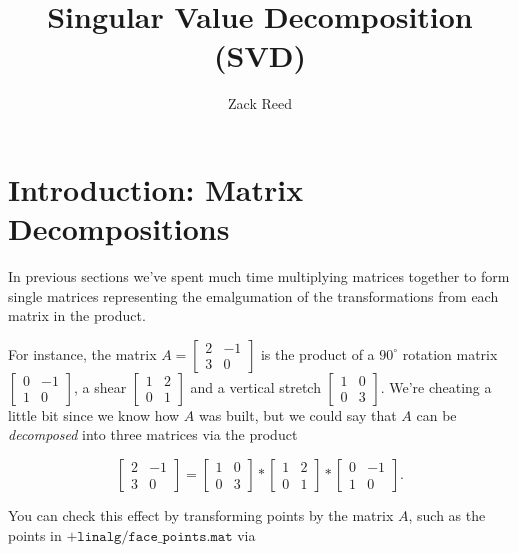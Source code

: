 \documentclass{ximera}
\author{Zack Reed}
\title{Singular Value Decomposition (SVD)}
\begin{document}
\begin{abstract}

\end{abstract}
\maketitle

\section*{Introduction: Matrix Decompositions}
In previous sections we've spent much time multiplying matrices together to form single matrices representing the emalgumation of the transformations from each matrix in the product. 

For instance, the matrix $A=\begin{bmatrix} 2 & -1 \\ 3 & 0\end{bmatrix}$ is the product of a $90^\circ$ rotation matrix $\begin{bmatrix}0 & -1\\ 1 & 0\end{bmatrix}$, a shear $\begin{bmatrix} 1 & 2 \\ 0 & 1\end{bmatrix}$ and a vertical stretch $\begin{bmatrix} 1 & 0 \\ 0 & 3\end{bmatrix}$. We're cheating a little bit since we know how $A$ was built, but we could say that $A$ can be \emph{decomposed} into three matrices via the product 

$$\begin{bmatrix} 2 & -1 \\ 3 & 0\end{bmatrix}=\begin{bmatrix} 1 & 0 \\ 0 & 3\end{bmatrix}*\begin{bmatrix} 1 & 2 \\ 0 & 1\end{bmatrix}*\begin{bmatrix}0 & -1\\ 1 & 0\end{bmatrix}.$$

You can check this effect by transforming points by the matrix $A$, such as the points in $\texttt{+linalg/face\_points.mat}$ via
\end{document}
